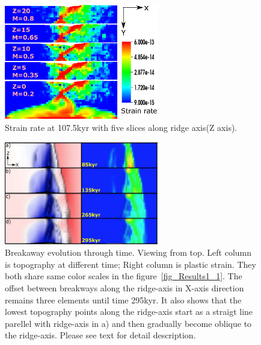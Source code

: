 \begin{figure}[hc]
  \centering
    \includegraphics[width=0.6\textwidth]{fig_Results1_2.eps}
  \caption{Strain rate at 107.5kyr with five slices along ridge axis(Z axis).}
 \label{fig_Results1_2}
\end{figure}   

\begin{figure}[hc]
  \centering
    \includegraphics[width=0.6\textwidth]{fig_Results1_4.eps}
  \caption{Breakaway evolution through time. Viewing from top. Left column is topography at different time; Right column is plastic strain. They both share same color scales in the figure~\hyperref[fig_Results1_1]{\ref{fig_Results1_1}}. The offset between breakways along the ridge-axis in X-axis direction remains three elements until time 295kyr. It also shows that the lowest topography points along the ridge-axis start as a straigt line parellel with ridge-axis in a) and then gradually become oblique to the ridge-axis. Please see text for detail description.}
 \label{fig_Results1_4}
\end{figure}

